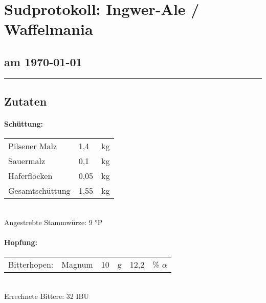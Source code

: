 \documentclass[12pt,oneside,a4paper]{scrartcl}
\begin{document}
	\begin{minipage}[c]{0.70\textwidth}
		\section*{\hspace{-.4cm}Sudprotokoll: {\color{green}Ingwer-Ale} / {\color{green}Waffelmania}}
	\end{minipage}
	\begin{minipage}[c]{0.29\textwidth}
		\subsection*{am \today}
	\end{minipage}
	\rule{\textwidth}{1pt}
%
\subsection*{Zutaten}
%
\paragraph{Schüttung:}
	\begin{tabular}[t]{m{8cm} m{2cm} m{1cm}}
		{\color{green}Pilsener Malz} & {\color{green}1,4} & kg\bigstrut\\
		{\color{green}Sauermalz} & {\color{green}0,1} & kg\bigstrut\\
		{\color{green}Haferflocken} & {\color{green}0,05} & kg \bigstrut\\ \hline
		Gesamtschüttung & {\color{red}1,55} & kg\bigstrut
	\end{tabular}\\

\vspace{.25cm}
\hspace{1cm}Angestrebte Stammwürze: {\color{green}9} °P
%
\paragraph{Hopfung:}
	\begin{tabular}[t]{m{2cm} m{5cm} m{0.5cm} m{1cm} m{0.5cm} m{1cm}}
		Bitterhopen: & {\color{green}Magnum} & {\color{green}10} & g & {\color{green}12,2} & \% $\alpha$ \\
	\end{tabular}\\

\vspace{.25cm}
\hspace{1cm}Errechnete Bittere: {\color{red}32} IBU
%
\end{document}
